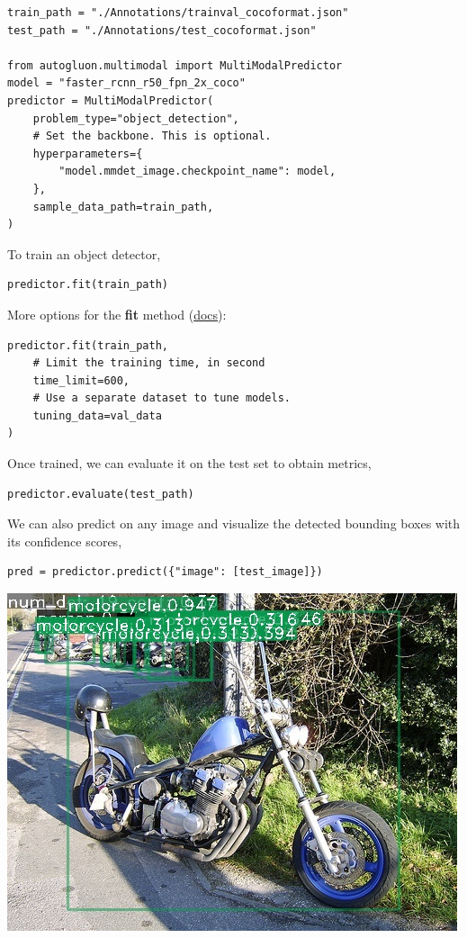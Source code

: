 \begin{verbatim}
train_path = "./Annotations/trainval_cocoformat.json"
test_path = "./Annotations/test_cocoformat.json"

from autogluon.multimodal import MultiModalPredictor
model = "faster_rcnn_r50_fpn_2x_coco"
predictor = MultiModalPredictor(
    problem_type="object_detection",
    # Set the backbone. This is optional.
    hyperparameters={
        "model.mmdet_image.checkpoint_name": model,
    },
    sample_data_path=train_path,
)
\end{verbatim}

To train an object detector,
\begin{verbatim}
predictor.fit(train_path)
\end{verbatim}

More options for the \textbf{fit} method (\href{https://auto.gluon.ai/stable/api/autogluon.predictor.html#autogluon.multimodal.MultiModalPredictor.fit}{docs}):

\begin{verbatim}
predictor.fit(train_path,
    # Limit the training time, in second
    time_limit=600,
    # Use a separate dataset to tune models.
    tuning_data=val_data
)
\end{verbatim}

Once trained, we can evaluate it on the test set to obtain metrics, 
\begin{verbatim}
predictor.evaluate(test_path)
\end{verbatim}

We can also predict on any image and visualize the detected bounding boxes with its confidence scores, 
\begin{verbatim}
pred = predictor.predict({"image": [test_image]})
\end{verbatim}

\begin{center}
\includegraphics[width=0.6\linewidth]{images/tiny_motorbike.png}
\end{center}

